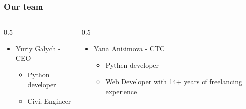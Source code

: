\documentclass[aspectratio=169]{beamer}
\begin{document}
\begin{frame}
    \frametitle{Our team}
    
    \begin{columns}
         
        \begin{column}{0.5\textwidth}
            \vspace{1cm}
            \begin{itemize}
                \item Yuriy Galych - CEO
                \begin{itemize}
                    \item Python developer
                    \item Civil Engineer
                \end{itemize}
            \end{itemize}
        \end{column}
        
        \begin{column}{0.5\textwidth}
            \vspace{1cm}
            \begin{itemize}
                \item Yana Anisimova - CTO
                \begin{itemize}
                    \item Python developer
                    \item Web Developer with 14+ years of freelancing experience
                \end{itemize}
            \end{itemize}
        \end{column}

    \end{columns}
    
\end{frame}
\end{document}

